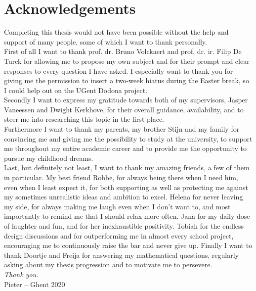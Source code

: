 
\chapter*{Acknowledgements}

Completing this thesis would not have been possible without the help and support of many people, some of which I want to thank personally.\\

\noindent First of all I want to thank prof. dr. Bruno Volckaert and prof. dr. ir. Filip De Turck for allowing me to propose my own subject and for their prompt and clear responses to every question I have asked. I especially want to thank you for giving me the permission to insert a two-week hiatus during the Easter break, so I could help out on the UGent Dodona project.\\

\noindent Secondly I want to express my gratitude towards both of my supervisors, Jasper Vaneessen and Dwight Kerkhove, for their overall guidance, availability, and to steer me into researching this topic in the first place.\\

\noindent Furthermore I want to thank my parents, my brother Stijn and my family for convincing me and giving me the possibility to study at the university, to support me throughout my entire academic career and to provide me the opportunity to pursue my childhood dreams.\\

\noindent Last, but definitely not least, I want to thank my amazing friends, a few of them in particular. My best friend Robbe, for always being there when I need him, even when I least expect it, for both supporting as well as protecting me against my sometimes unrealistic ideas and ambition to excel. Helena for never leaving my side, for always making me laugh even when I don't want to, and most importantly to remind me that I should relax more often. Jana for my daily dose of laughter and fun, and for her inexhaustible positivity. Tobiah for the endless design discussions and for outperforming me in almost every school project, encouraging me to continuously raise the bar and never give up. Finally I want to thank Doortje and Freija for answering my mathematical questions, regularly asking about my thesis progression and to motivate me to persevere.\\

\noindent \emph{Thank you.}\\

\noindent Pieter -- Ghent 2020